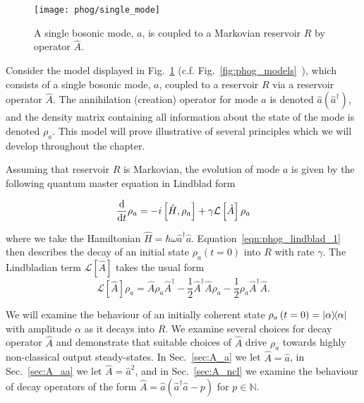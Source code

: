 \begin{figure}[htp]
\centering
\texttt{[image: phog/single\_mode]}
\caption{\label{fig:phog_single_mode} A single bosonic mode, $a$, is coupled to a Markovian reservoir $R$ by operator $\hat{A}$. }
\end{figure}


Consider the model displayed in Fig.~\ref{fig:phog_single_mode} (c.f. Fig.~\ref{fig:phog_models}~\MakeUppercase{}), which consists of a single bosonic mode, $a$, coupled to a reservoir $R$ via a reservoir operator $\hat{A}$. The annihilation (creation) operator for mode $a$ is denoted $\hat{a} \left(\hat{a}^\dagger\right)$, and the density matrix containing all information about the state of the mode is denoted $\rho_a$. This model will prove illustrative of several principles which we will develop throughout the chapter. 

Assuming that reservoir $R$ is Markovian, the evolution of mode $a$ is given by the following quantum master equation in Lindblad form


\begin{equation}\label{eqn:phog_lindblad_1}
\frac{\mathrm{d}}{\mathrm{d}t} \rho_a =  - i \left[\hat{H}, \rho_a\right] + \gamma \mathcal{L}\left[\hat{A}\right]\rho_a
\end{equation}

\noindent where we take the Hamiltonian $\hat{H} = \hbar \omega \hat{a}^\dagger \hat{a}$. Equation~\ref{eqn:phog_lindblad_1} then describes the decay of an initial state $\rho_a\left(t=0\right)$ into $R$ with rate $\gamma$. The Lindbladian term $\mathcal{L}\left[\hat{A}\right]$ takes the usual form
\begin{equation}\label{eqn:phog_lindbladian_form}
\mathcal{L}\left[\hat{A}\right]\rho_a = \hat{A}\rho_a\hat{A}^\dagger - \frac{1}{2} \hat{A}^\dagger \hat{A} \rho_a - \frac{1}{2} \rho_a \hat{A}^\dagger \hat{A}.
\end{equation}

\noindent We will examine the behaviour of an initially coherent state $\rho_a\left(t=0\right) = \dyad{\alpha}$ with amplitude $\alpha$ as it decays into $R$. We examine several choices for decay operator $\hat{A}$ and demonstrate that suitable choices of $\hat{A}$ drive $\rho_a$ towards highly non-classical output steady-states. In Sec.~\ref{sec:A_a} we let $\hat{A} = \hat{a}$, in Sec.~\ref{sec:A_aa} we let $\hat{A} = \hat{a}^2$, and in Sec.~\ref{sec:A_ncl} we examine the behaviour of decay operators of the form $\hat{A} = \hat{a} \left(\hat{a}^\dagger \hat{a} - p\right)$ for $p \in \mathbb{N}$.



